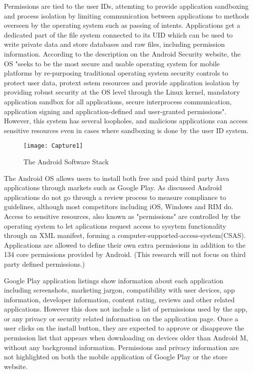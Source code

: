 Permissions are tied to the user IDs, attemting to provide application sandboxing and process isolation by limiting communication between applications to methods overseen by the operating system such as passing of intents. Applications get a dedicated part of the file system connected to its UID whiich can be used to write private data and store databases and raw files, including permission information. According to the description on the Android Security website, the OS "seeks to be the most secure and usable operating system for mobile platforms by re-purposing traditional operating system security controls to protect user data, protext sstem resources and provide application isolation by providing robust security at the OS level through the Linux kernel, mandatory application sandbox for all applications, secure interprocess communication, application signing and application-defined and user-granted permissions"\cite{diagrameka}. However, this system has several loopholes, and malicious applications can access sensitive resources even in cases where sandboxing is done by the user ID system\cite{meshram2014survey}. 
\smallskip
\begin{figure}
\texttt{[image: Capture1]}
\caption{The Android Software Stack}
\end{figure}
\smallskip

The Android OS allows users to install both free and paid third party Java applications through markets such as Google Play. As discussed Android applications do not go through a review process to measure compliance to guidelines, although most competitors including iOS, Windows and RIM do. Access to sensitive resources, also known as "permissions" are controlled by the operating system to let aplications request access to sysytem functionality through an XML manifest, forming a computer-supported-access-system(CSAS)\cite{stevens2009computer}. Applications are allowed to define their own extra permissions in addition to the 134 core permissions provided by Android\cite{a}. (This research will not focus on third party defined permissions.)

Google Play application listings show information about each application including screenshots, marketing jargon, compatibility with user devices, app information, developer information, content rating, reviews and other related applications. However this does not include a list of permissions used by the app, or any privacy or security related information on the application page. Once a user clicks on the install button, they are expected to approve or disapprove the permission list that appears when downloading on devices older than Android M, without any background information. Permissions and privacy information are not highlighted on both the mobile application of Google Play or the store website\cite{kelley2013privacy}. 

